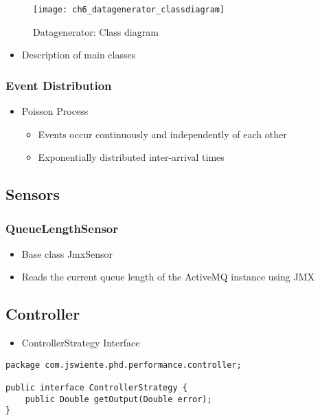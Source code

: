 \begin{figure}[htpb]
	\centering
	\texttt{[image: ch6\_datagenerator\_classdiagram]}
	\caption{Datagenerator: Class diagram}
	\label{fig:ch5_datagenerator_classdiagram}
\end{figure}

\begin{itemize}
	\item Description of main classes
\end{itemize}

\subsubsection{Event Distribution}

\begin{itemize}
	\item Poisson Process
	\begin{itemize}
		\item Events occur continuously and independently of each other
		\item Exponentially distributed inter-arrival times
	\end{itemize}
\end{itemize}

\subsection{Sensors}

\subsubsection{QueueLengthSensor}

\begin{itemize}
	\item Base class JmxSensor
	\item Reads the current queue length of the ActiveMQ instance using JMX
\end{itemize}

\subsection{Controller}

\begin{itemize}
	\item ControllerStrategy Interface
\end{itemize}

\begin{lstlisting}[caption={ControllerStrategy Interface},label=listing:ch5_controller_strategy]
package com.jswiente.phd.performance.controller;

public interface ControllerStrategy {
	public Double getOutput(Double error);
}
\end{lstlisting}

